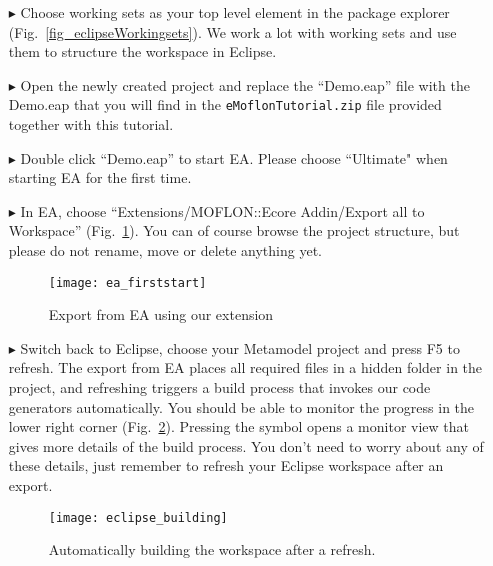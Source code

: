 \begin{enumerate}
\FloatBarrier
\item[$\blacktriangleright$] Choose working sets as your top level element in the package explorer (Fig.~\ref{fig_eclipseWorkingsets}).
We work a lot with working sets and use them to structure the workspace in Eclipse.

\item[$\blacktriangleright$] Open the newly created project and replace the ``Demo.eap'' file with the Demo.eap that you will find in the \texttt{eMoflonTutorial.zip} file provided together with this tutorial.

\item[$\blacktriangleright$] Double click ``Demo.eap'' to start EA.
Please choose ``Ultimate" when starting EA for the first time.

\clearpage
\texHeader
\mbox{}
\pagebreak

\visHeader
  
\item[$\blacktriangleright$] In EA, choose ``Extensions/MOFLON::Ecore Addin/Export\- all\- to\- Workspace'' (Fig.~\ref{fig_ea}).
You can of course browse the project structure, but please do not rename, move or delete anything yet.

\begin{figure}[htbp]
	\centering
  \texttt{[image: ea\_firststart]}
	\caption{Export from EA using our extension} 
	\label{fig_ea} 
\end{figure}


\visHeader
\item[$\blacktriangleright$] Switch back to Eclipse, choose your Metamodel project and press F5 to refresh.
The export from EA places all required files in a hidden folder in the project, and refreshing triggers a build process that invokes our code generators automatically.
You should be able to monitor the progress in the lower right corner (Fig.~\ref{fig_eclipsebuilding}).  
Pressing the symbol opens a monitor view that gives more details of the build process. 
You don't need to worry about any of these details, just remember to refresh your Eclipse workspace after an export.
\begin{figure}[htbp]
	\centering
  \texttt{[image: eclipse\_building]}
	\caption{Automatically building the workspace after a refresh.}
	\label{fig_eclipsebuilding}
\end{figure}

\end{enumerate}
\clearpage
\texHeader
\mbox{}
\pagebreak


